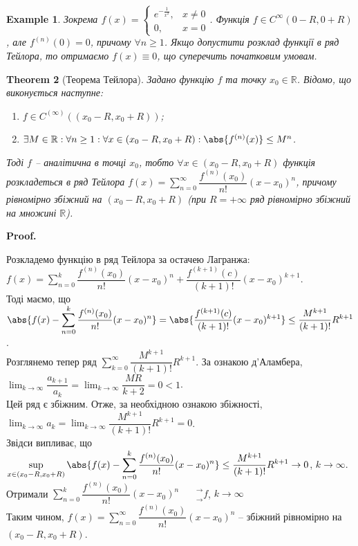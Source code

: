 \documentclass[a4paper, 10pt]{article}
\makeatletter
\def\huge{\displaystyle}
\def\qed{$\blacksquare$}
\theoremstyle{theoremdd}
\newtheorem{theorem}{Theorem}[subsection]
\theoremstyle{theoremdd}
\theoremstyle{theoremdd}
\theoremstyle{theoremdd}
\theoremstyle{theoremdd}
\newtheorem{example}[theorem]{Example}
\theoremstyle{theoremdd}
\theoremstyle{theoremdd}
\theoremstyle{theoremdd}
\theoremstyle{theoremdd}
\renewenvironment{proof}[1][Proof.\\]{\par
\pushQED{\hfill \qed}%
\normalfont \topsep6\p@\@plus6\p@\relax
\trivlist
\item\relax
{\bfseries
#1\@addpunct{.}}\hspace\labelsep\ignorespaces
}{%
\popQED\endtrivlist\@endpefalse
}
\makeatother
\begin{document}
\begin{example}
Зокрема $f(x) = \begin{cases} e^{-\frac{1}{x^2}}, & x \neq 0 \\ 0, & x = 0 \end{cases}$.  Функція $f \in C^\infty (0-R,0+R)$, але $f^{(n)}(0) = 0$, причому $\forall n \geq 1$. Якщо допустити розклад функції в ряд Тейлора, то отримаємо $f(x) \equiv 0$, що суперечить початковим умовам.
\end{example}

\begin{theorem}[Теорема Тейлора]
Задано функцію $f$ та точку $x_0 \in \mathbb{R}$. Відомо, що виконується наступне:
\begin{enumerate}[nosep,wide=0pt,label={\arabic*)}]
\item $f \in C^{(\infty)}((x_0-R,x_0+R))$;
\item $\exists M \in \mathbb{R}: \forall n \geq 1: \forall x \in (x_0-R, x_0+R): \abs{f^{(n)}(x)} \leq M^n$.
\end{enumerate}
Тоді $f$ -- аналітична в точці $x_0$, тобто $\forall x \in (x_0-R, x_0+R)$ функція розкладеться в ряд Тейлора $f(x) = \huge \sum_{n=0}^\infty \dfrac{f^{(n)}(x_0)}{n!}(x-x_0)^n$, причому рівномірно збіжний на $(x_0-R,x_0+R)$ (при $R = +\infty$ ряд рівномірно збіжний на множині $\mathbb{R}$).
\end{theorem}

\begin{proof}
Розкладемо функцію в ряд Тейлора за остачею Лагранжа:\\
$f(x) = \huge \sum_{n=0}^k \dfrac{f^{(n)}(x_0)}{n!}(x-x_0)^n + \dfrac{f^{(k+1)}(c)}{(k+1)!}(x-x_0)^{k+1}$.\\
Тоді маємо, що\\
$\huge \abs{f(x) - \sum_{n=0}^k \dfrac{f^{(n)}(x_0)}{n!}(x-x_0)^n} = \abs{\dfrac{f^{(k+1)}(c)}{(k+1)!}(x-x_0)^{k+1}} \leq \dfrac{M^{k+1}}{(k+1)!}R^{k+1}$.\\
Розглянемо тепер ряд $\huge \sum_{k=0}^\infty \dfrac{M^{k+1}}{(k+1)!} R^{k+1}$. За ознакою д'Аламбера, $\huge \lim_{k \to \infty} \dfrac{a_{k+1}}{a_k} = \huge \lim_{k \to \infty} \dfrac{MR}{k+2} = 0 < 1$.\\
Цей ряд є збіжним. Отже, за необхідною ознакою збіжності, $\huge \lim_{k \to \infty} a_k = \lim_{k \to \infty} \dfrac{M^{k+1}}{(k+1)!} R^{k+1} = 0$.\\
Звідси випливає, що\\
$\huge \sup_{x \in (x_0-R,x_0+R)} \abs{f(x) - \sum_{n=0}^k \dfrac{f^{(n)}(x_0)}{n!}(x-x_0)^n} \leq \dfrac{M^{k+1}}{(k+1)!}R^{k+1} \to 0$, $k \to \infty$.\\
Отримали $\huge \sum_{n=0}^k \dfrac{f^{(n)}(x_0)}{n!}(x-x_0)^n \phantom{()}^\rightarrow_\rightarrow f$, $k \to \infty$\\
Таким чином, $f(x) = \huge \sum_{n=0}^\infty \dfrac{f^{(n)}(x_0)}{n!}(x-x_0)^n$ -- збіжний рівномірно на $(x_0-R,x_0+R)$.
\end{proof}
\end{document}
